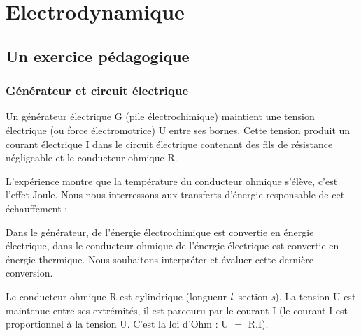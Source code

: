 \chapter{Electrodynamique}

\section{Un exercice pédagogique}
\subsection{Générateur et circuit électrique}
\begin{minipage}[c]{.5\linewidth}
\hspace{0.7cm}Un générateur électrique G (pile électrochimique) maintient une tension électrique (ou force électromotrice) U entre ses bornes. Cette tension produit un courant électrique I dans le circuit électrique contenant des fils de résistance négligeable et le conducteur ohmique R.
\end{minipage}
\hfill
\begin{minipage}[c]{.5\linewidth}
\begin{center}
\end{center}
\end{minipage}\vspace{0.5cm}

L'expérience montre que la température du conducteur ohmique s'élève, c'est l'effet Joule. Nous nous interressons aux transferts d'énergie responsable de cet échauffement :

Dans le générateur, de l'énergie électrochimique est convertie en énergie électrique, dans le conducteur ohmique de l'énergie électrique est convertie en énergie thermique. Nous souhaitons interpréter et évaluer cette dernière conversion.

Le conducteur ohmique R est cylindrique (longueur {\it l}, section {\it s}). La tension U est maintenue entre ses extrémités, il est parcouru par le courant I (le courant I est proportionnel à la tension U. C'est la loi d'Ohm : U $=$ R.I).

